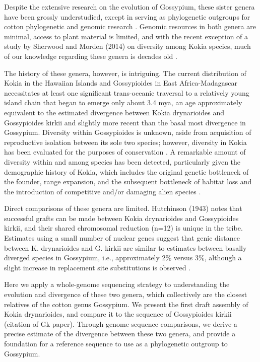 \documentclass[10pt,letterpaper]{article}
\begin{document}
Despite the extensive research on the evolution of Gossypium, these sister
genera have been grossly understudied, except in serving as phylogenetic
outgroups for cotton phylogenetic and genomic research \cite{Seelanan1997}
\cite{Cronn2002}. Genomic resources in both genera are minimal, access to plant
material is limited, and with the recent exception of a study by Sherwood and
Morden (2014) on diversity among Kokia species, much of our knowledge regarding
these genera is decades old \cite{Hutchinson1947} \cite{Seelanan1997}
\cite{Fryxell1968}.

The history of these genera, however, is intriguing. The current distribution of
Kokia in the Hawaiian Islands and Gossypioides in East Africa-Madagascar
necessitates at least one significant trans-oceanic traversal to a relatively
young island chain that began to emerge only about 3.4 mya, an age approximately
equivalent to the estimated divergence between Kokia drynarioides and
Gossypioides kirkii \cite{Seelanan1997} and slightly more recent than the basal
most divergence in Gossypium. Diversity within Gossypioides is unknown, aside
from acquisition of reproductive isolation between its sole two species;
however, diversity in Kokia has been evaluated for the purposes of conservation
\cite{Sherwood2014}. A remarkable amount of diversity within and among species
has been detected, particularly given the demographic history of Kokia, which
includes the original genetic bottleneck of the founder, range expansion, and
the subsequent bottleneck of habitat loss and the introduction of competitive
and/or damaging alien species \cite{Sherwood2014}.

Direct comparisons of these genera are limited. Hutchinson (1943) notes that
successful grafts can be made between Kokia drynarioides and Gossypioides
kirkii, and their shared chromosomal reduction (n=12) is unique in the tribe.
Estimates using a small number of nuclear genes suggest that genic distance
between K. drynarioides and G. kirkii are similar to estimates between basally
diverged species in Gossypium, i.e., approximately 2\% versus 3\%, although a
slight increase in replacement site substitutions is observed \cite{Cronn2002}.                                

Here we apply a whole-genome sequencing strategy to understanding the evolution
and divergence of these two genera, which collectively are the closest relatives
of the cotton genus  Gossypium. We present the first draft assembly of Kokia
drynarioides, and compare it to the sequence of Gossypioides kirkii (citation of
Gk paper). Through genome sequence comparisons, we derive a precise estimate of
the divergence between these two genera, and provide a foundation for a
reference sequence to use as a phylogenetic outgroup to Gossypium.
\end{document}
